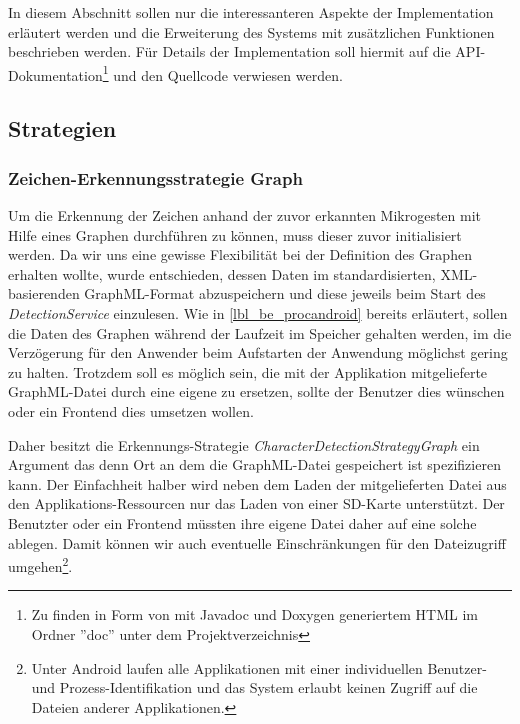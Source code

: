 In diesem Abschnitt sollen nur die interessanteren Aspekte der Implementation erläutert werden und die Erweiterung des Systems mit zusätzlichen Funktionen beschrieben werden. Für Details der Implementation soll hiermit auf die API-Dokumentation\footnote{Zu finden in Form von mit Javadoc und Doxygen generiertem HTML im Ordner ''doc'' unter dem Projektverzeichnis} und den Quellcode verwiesen werden.

\subsection{Strategien}

\subsubsection{Zeichen-Erkennungsstrategie Graph}

Um die Erkennung der Zeichen anhand der zuvor erkannten Mikrogesten mit Hilfe eines Graphen durchführen zu können, muss dieser zuvor initialisiert werden. Da wir uns eine gewisse Flexibilität bei der Definition des Graphen erhalten wollte, wurde entschieden, dessen Daten im standardisierten, XML-basierenden GraphML-Format\cite{graphml_primer} abzuspeichern und diese jeweils beim Start des \emph{DetectionService} einzulesen. Wie in \ref{lbl_be_procandroid} bereits erläutert, sollen die Daten des Graphen während der Laufzeit im Speicher gehalten werden, im die Verzögerung für den Anwender beim Aufstarten der Anwendung möglichst gering zu halten. Trotzdem soll es möglich sein, die mit der Applikation mitgelieferte GraphML-Datei durch eine eigene zu ersetzen, sollte der Benutzer dies wünschen oder ein Frontend dies umsetzen wollen.

Daher besitzt die Erkennungs-Strategie \emph{CharacterDetectionStrategyGraph} ein Argument das denn Ort an dem die GraphML-Datei gespeichert ist spezifizieren kann. Der Einfachheit halber wird neben dem Laden der mitgelieferten Datei aus den Applikations-Ressourcen nur das Laden von einer SD-Karte unterstützt. Der Benutzter oder ein Frontend müssten ihre eigene Datei daher auf eine solche ablegen. Damit können wir auch eventuelle Einschränkungen für den Dateizugriff umgehen\footnote{Unter Android laufen alle Applikationen mit einer individuellen Benutzer- und Prozess-Identifikation und das System erlaubt keinen Zugriff auf die Dateien anderer Applikationen.}.

